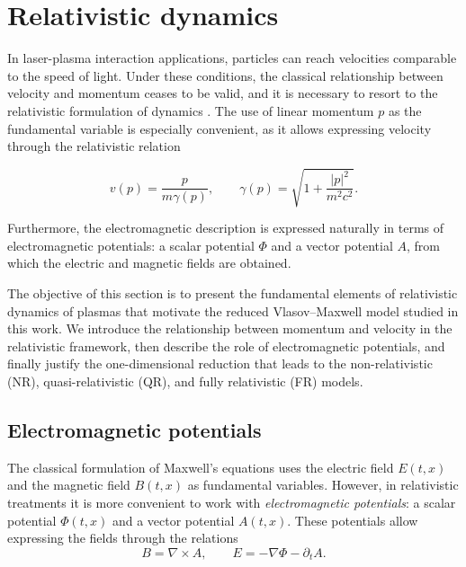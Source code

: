 \documentclass[11pt,a4paper,twoside,pdf]{article}
\numberwithin{equation}{section}
\begin{document}
\section{Relativistic dynamics}




In laser-plasma interaction applications, particles can reach velocities comparable to the speed of light. Under these conditions, the classical relationship between velocity and momentum ceases to be valid, and it is necessary to resort to the relativistic formulation of dynamics \cite{janssen2022gravitacion}. The use of linear momentum $p$ as the fundamental variable is especially convenient, as it allows expressing velocity through the relativistic relation


\[
v(p)=\frac{p}{m\gamma(p)}, \qquad
\gamma(p)=\sqrt{1+\frac{|p|^2}{m^2c^2}}.
\]




Furthermore, the electromagnetic description is expressed naturally in terms of electromagnetic potentials: a scalar potential $\Phi$ and a vector potential $A$, from which the electric and magnetic fields are obtained. \newline

The objective of this section is to present the fundamental elements of relativistic dynamics of plasmas that motivate the reduced Vlasov--Maxwell model studied in this work. We introduce the relationship between momentum and velocity in the relativistic framework, then describe the role of electromagnetic potentials, and finally justify the one-dimensional reduction that leads to the non-relativistic (NR), quasi-relativistic (QR), and fully relativistic (FR) models.




\subsection{Electromagnetic potentials}

The classical formulation of Maxwell's equations uses the electric field $E(t,x)$ and the magnetic field $B(t,x)$ as fundamental variables. However, in relativistic treatments it is more convenient to work with \emph{electromagnetic potentials}: a scalar potential $\Phi(t,x)$ and a vector potential $A(t,x)$. These potentials allow expressing the fields through the relations \cite{martin2021campo}
\begin{equation}
B = \nabla \times A, \qquad
E = -\nabla \Phi - \partial_t A.
\label{eq:potenciales}
\end{equation}
\end{document}
